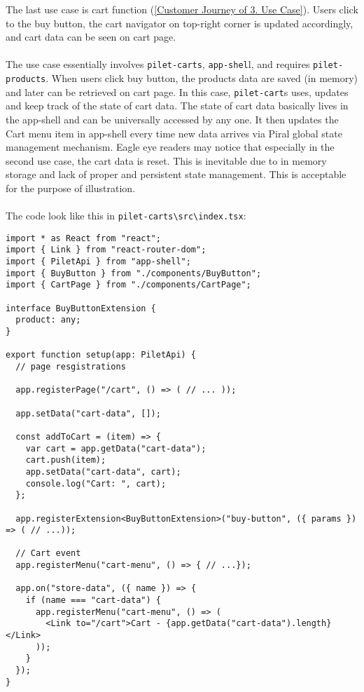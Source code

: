 \documentclass[a4paper]{book}
\begin{document}
The last use case is cart function (\ref{Customer Journey of 3. Use Case}). Users click to the buy button, the cart navigator on top-right corner is updated accordingly, and cart data can be seen on cart page.
\\ \\ 
The use case essentially involves \verb|pilet-carts|, \verb|app-shel|l, and requires \verb|pilet-products|. When users click buy button, the products data are saved (in memory) and later can be retrieved on cart page. In this case, \verb|pilet-cart|s uses, updates and keep track of the state of cart data. The state of cart data basically lives in the app-shell and can be universally accessed by any one. It then updates the Cart menu item in app-shell every time new data arrives via Piral global state management mechanism. Eagle eye readers may notice that especially in the second use case, the cart data is reset. This is inevitable due to in memory storage and lack of proper and persistent state management. This is acceptable for the purpose of illustration.
\\ \\
The code look like this in \verb|pilet-carts\src\index.tsx|:
\begin{lstlisting}[caption={pilet-carts handles cart data}]
import * as React from "react";
import { Link } from "react-router-dom";
import { PiletApi } from "app-shell";
import { BuyButton } from "./components/BuyButton";
import { CartPage } from "./components/CartPage";

interface BuyButtonExtension {
  product: any;
}

export function setup(app: PiletApi) {
  // page resgistrations

  app.registerPage("/cart", () => ( // ... ));

  app.setData("cart-data", []);

  const addToCart = (item) => {
    var cart = app.getData("cart-data");
    cart.push(item);
    app.setData("cart-data", cart);
    console.log("Cart: ", cart);
  };

  app.registerExtension<BuyButtonExtension>("buy-button", ({ params }) => ( // ...));

  // Cart event
  app.registerMenu("cart-menu", () => { // ...});

  app.on("store-data", ({ name }) => {
    if (name === "cart-data") {
      app.registerMenu("cart-menu", () => (
        <Link to="/cart">Cart - {app.getData("cart-data").length} </Link>
      ));
    }
  });
}

\end{lstlisting}
\end{document}
